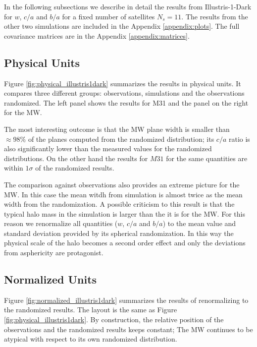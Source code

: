 \documentclass[a4paper,fleqn,usenatbib]{mnras}
\begin{document}
In the following subsections we describe in detail the results from
Illustris-1-Dark for $w$, $c/a$ and $b/a$ for a fixed number of
satellites $N_s=11$.
The results from the other two simulations are included in the
Appendix \ref{appendix:plots}. 
The full covariance matrices are in the Appendix
\ref{appendix:matrices}. 


\subsection{Physical Units}



Figure \ref{fig:physical_illustris1dark} summarizes the results in
physical units.
It compares three different groups: observations, simulations and the
observations randomized.
The left panel shows the results for M31 and the panel on the right for
the MW.

The most interesting outcome is that the MW plane width is smaller
than $\approx 98\%$ of the planes computed from the randomized distribution;
its  $c/a$ ratio is also significantly lower than the measured values for
the randomized distributions.   
On the other hand the results for $M31$ for the same quantities are
within $1\sigma$ of the randomized results.

The comparison against observations also provides an extreme picture
for the MW. 
In this case the mean witdh from simulation is almost twice as the
mean width from the randomization. 
A possible criticism to this result is that the typical halo mass in
the simulation is larger than the it is for the MW. 
For this reason we renormalize all quantities ($w$, $c/a$ and $b/a$)
to the mean value and standard deviation provided by its spherical
randomization. 
In this way the physical scale of the halo becomes a second order
effect and only the deviations from asphericity are protagonist.


\subsection{Normalized Units}

Figure \ref{fig:normalized_illustris1dark} summarizes  the results of
renormalizing to the randomized results.
The layout is the same as Figure \ref{fig:physical_illustris1dark}.
By construction, the relative position of the observations and the
randomized results keeps constant; The MW continues to be atypical
with respect to its own randomized distribution.
\end{document}
